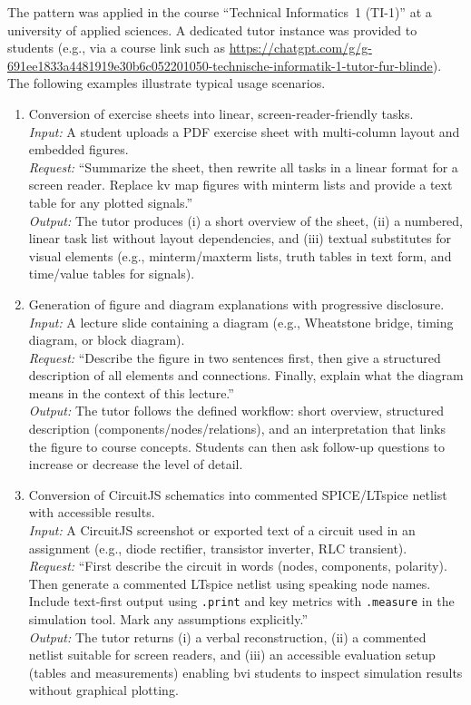 The pattern was applied in the course ``Technical Informatics~1 (TI-1)'' at a university of applied sciences. A dedicated tutor instance was provided to students (e.g., via a course link such as \url{https://chatgpt.com/g/g-691ee1833a4481919e30b6c052201050-technische-informatik-1-tutor-fur-blinde}). The following examples illustrate typical usage scenarios.

\begin{enumerate}
    \item Conversion of exercise sheets into  linear, screen-reader-friendly tasks.\\
    \emph{Input:} A student uploads a PDF exercise sheet with multi-column layout and embedded figures.\\
    \emph{Request:} ``Summarize the sheet, then rewrite all tasks in a linear format for a screen reader. Replace \ac{kv} map figures with minterm lists and provide a text table for any plotted signals.''\\
    \emph{Output:} The tutor produces (i) a short overview of the sheet, (ii) a numbered, linear task list without layout dependencies, and (iii) textual substitutes for visual elements (e.g., minterm/maxterm lists, truth tables in text form, and time/value tables for signals).

    \item Generation of figure and diagram explanations with progressive disclosure.\\
    \emph{Input:} A lecture slide containing a diagram (e.g., Wheatstone bridge, timing diagram, or block diagram).\\
    \emph{Request:} ``Describe the figure in two sentences first, then give a structured description of all elements and connections. Finally, explain what the diagram means in the context of this lecture.''\\
    \emph{Output:} The tutor follows the defined workflow: short overview, structured description (components/nodes/relations), and an interpretation that links the figure to course concepts. Students can then ask follow-up questions to increase or decrease the level of detail.

    \item Conversion of CircuitJS schematics into commented SPICE/LTspice netlist with accessible results.\\
    \emph{Input:} A CircuitJS screenshot or exported text of a circuit used in an assignment (e.g., diode rectifier, transistor inverter, RLC transient).\\
    \emph{Request:} ``First describe the circuit in words (nodes, components, polarity). Then generate a commented LTspice netlist using speaking node names. Include text-first output using \texttt{.print} and key metrics with \texttt{.measure} in the simulation tool. Mark any assumptions explicitly.''\\
    \emph{Output:} The tutor returns (i) a verbal reconstruction, (ii) a commented netlist suitable for screen readers, and (iii) an accessible evaluation setup (tables and measurements) enabling \ac{bvi} students to inspect simulation results without graphical plotting.
\end{enumerate}

